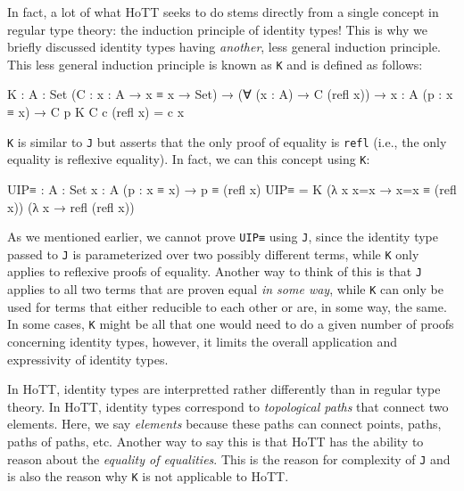 \documentclass[12pt]{article}
\begin{document}
In fact, a lot of what HoTT seeks to do stems directly from a single concept in
regular type theory: the induction principle of identity types! This is why we
briefly discussed identity types having {\em another}, less general induction
principle. This less general induction principle is known as {\tt K} and is
defined as follows:
\begin{center}
\begin{minipage}{0.9\textwidth}
\begin{code}
K : {A : Set} (C : {x : A} → x ≡ x → Set) →
    (∀ (x : A) → C (refl x)) →
    {x : A} (p : x ≡ x) → C p
K C c (refl x) = c x
\end{code}
\end{minipage}
\end{center}
{\tt K} is similar to {\tt J} but asserts that the only proof of equality is
{\tt refl} (i.e., the only equality is reflexive equality). In fact, we can
this concept using {\tt K}:
\begin{center}
\begin{minipage}{0.9\textwidth}
\begin{code}
UIP≡ : {A : Set} {x : A} (p : x ≡ x) → p ≡ (refl x)
UIP≡ = 
  K (λ {x} x=x → x=x ≡ (refl x))
    (λ x → refl (refl x))
\end{code}
\end{minipage}
\end{center}
As we mentioned earlier, we cannot prove {\tt UIP≡} using {\tt J}, since the
identity type passed to {\tt J} is parameterized over two possibly different
terms, while {\tt K} only applies to reflexive proofs of equality. Another way
to think of this is that {\tt J} applies to all two terms that are proven equal
{\em in some way}, while {\tt K} can only be used for terms that either
reducible to each other or are, in some way, the same. In some cases, {\tt K}
might be all that one would need to do a given number of proofs concerning
identity types, however, it limits the overall application and expressivity of
identity types.

In HoTT, identity types are interpretted rather differently than in regular type
theory. In HoTT, identity types correspond to {\em topological paths} that
connect two elements. Here, we say {\em elements} because these paths can
connect points, paths, paths of paths, etc. Another way to say this is that HoTT
has the ability to reason about the {\em equality of equalities}. This is the
reason for complexity of {\tt J} and is also the reason why {\tt K} is not
applicable to HoTT.
\end{document}
